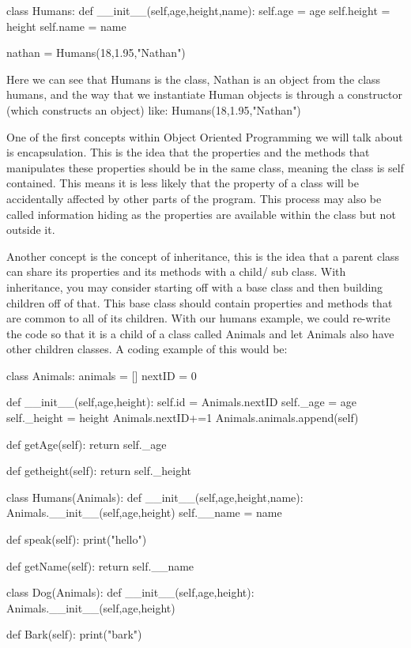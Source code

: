   \begin{python}
class Humans:
	def __init__(self,age,height,name):
		self.age = age
		self.height = height
		self.name = name

nathan = Humans(18,1.95,"Nathan")\end{python}
  Here we can see that Humans is the class, Nathan is an object from the class humans, and the way that we instantiate Human objects is through a constructor (which constructs an object) like: Humans(18,1.95,"Nathan")

  One of the first concepts within Object Oriented Programming we will talk about is encapsulation. This is the idea that the properties and the methods that manipulates these properties should be in the same class, meaning the class is self contained. This means it is less likely that the property of a class will be accidentally affected by other parts of the program. This process may also be called information hiding as the properties are available within the class but not outside it.

  Another concept is the concept of inheritance, this is the idea that a parent class can share its properties and its methods with a child/ sub class. With inheritance, you may consider starting off with a base class and then building children off of that. This base class should contain properties and methods that are common to all of its children. With our humans example, we could re-write the code so that it is a child of a class called Animals and let Animals also have other children classes. A coding example of this would be:
  \begin{python}
class Animals:
	animals = []
	nextID = 0

	def __init__(self,age,height):
		self.id = Animals.nextID
		self._age = age
		self._height = height
		Animals.nextID+=1
		Animals.animals.append(self)

	def getAge(self):
		return self._age

	def getheight(self):
		return self._height

class Humans(Animals):
	def __init__(self,age,height,name):
		Animals.__init__(self,age,height)
		self.__name = name

	def speak(self):
		print("hello")

	def getName(self):
		return self.__name

class Dog(Animals):
	def __init__(self,age,height):
		Animals.__init__(self,age,height)

	def Bark(self):
		print("bark")
  	\end{python}

